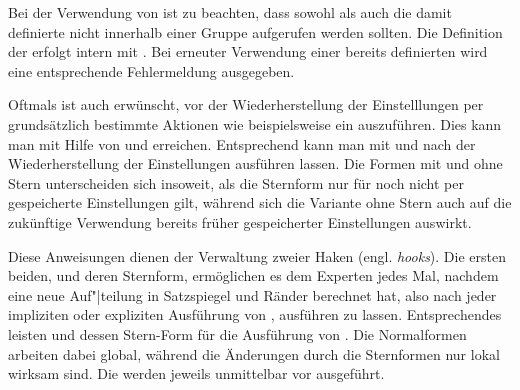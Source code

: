 Bei der Verwendung von  ist zu beachten,
dass sowohl  als auch die damit definierte 
nicht innerhalb einer Gruppe aufgerufen werden sollten. Die Definition der
 erfolgt intern mit
. Bei
erneuter Verwendung einer bereits definierten  wird eine
entsprechende Fehlermeldung ausgegeben.

Oftmals ist auch erwünscht, vor der
Wiederherstellung der Einstelllungen per  grundsätzlich
bestimmte Aktionen wie beispielsweise ein
 auszuführen. Dies kann man mit Hilfe
von  und 
erreichen. Entsprechend kann man mit  und
  nach der Wiederherstellung der
Einstellungen ausführen lassen. Die Formen mit und ohne Stern unterscheiden
sich insoweit, als die Sternform nur für noch nicht per 
gespeicherte Einstellungen gilt, während sich die Variante ohne Stern auch auf
die zukünftige Verwendung bereits früher gespeicherter Einstellungen
auswirkt.%
%
\EndIndexGroup


\begin{Declaration}
\end{Declaration}%
Diese Anweisungen dienen der Verwaltung zweier Haken (engl.
\emph{hooks}). Die ersten beiden,
 und deren Sternform, ermöglichen es dem
Experten jedes Mal, nachdem  eine neue Auf"|teilung in
Satzspiegel und Ränder berechnet hat, also nach jeder impliziten oder
expliziten Ausführung von , 
ausführen zu lassen. Entsprechendes leisten
 und dessen
Stern-Form für die Ausführung von . Die
Normalformen arbeiten dabei global, während die Änderungen durch die
Sternformen nur lokal wirksam sind. Die  werden jeweils
unmittelbar vor  ausgeführt.%
% 
\EndIndexGroup


